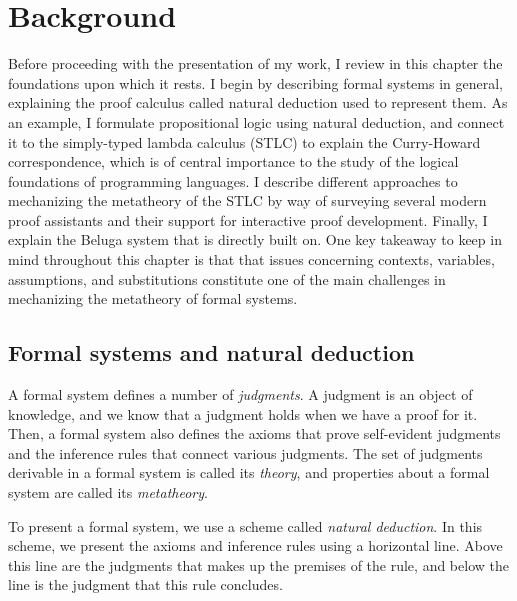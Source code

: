 \chapter{Background}
\label{chap:background}

Before proceeding with the presentation of my work, I review in this chapter the
foundations upon which it rests.
I begin by describing formal systems in general, explaining the proof calculus
called natural deduction used to represent them.
As an example, I formulate propositional logic using natural deduction, and
connect it to the simply-typed lambda calculus (STLC) to explain the
Curry-Howard correspondence, which is of central importance to the study of the
logical foundations of programming languages.
I describe different approaches to mechanizing the metatheory of the STLC by way
of surveying several modern proof assistants and their support for interactive
proof development.
Finally, I explain the Beluga system that \Harpoon{} is directly built on.
One key takeaway to keep in mind throughout this chapter is that that issues
concerning contexts, variables, assumptions, and substitutions constitute one of
the main challenges in mechanizing the metatheory of formal systems.

\section{Formal systems and natural deduction}

A formal system defines a number of \emph{judgments}.
A judgment is an object of knowledge, and we know that a judgment holds when we
have a proof for it.
Then, a formal system also defines the axioms that prove self-evident judgments
and the inference rules that connect various judgments.
The set of judgments derivable in a formal system is called its \emph{theory},
and properties about a formal system are called its
\emph{metatheory}\footnotemark.

To present a formal system, we use a scheme called
\emph{natural deduction}.
In this scheme, we present the axioms and inference rules using a horizontal
line\footnotemark.
Above this line are the judgments that makes up the premises of the rule, and
below the line is the judgment that this rule concludes.
%

